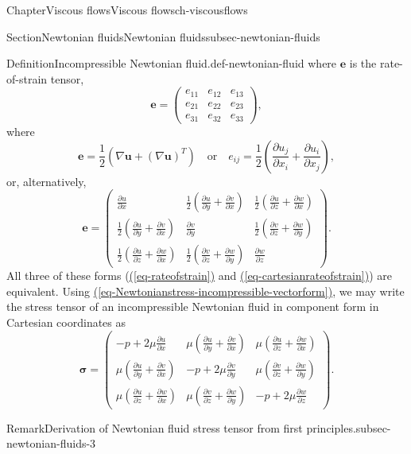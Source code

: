 \documentclass[oneside,10pt,]{book}
\newcommand{\xreffont}{\relax}
\numberwithin{equation}{section}
\newcommand{\pd}[2]{\frac{\partial#1}{\partial#2}}
\newcommand{\be}{\boldsymbol{e}}
\newcommand{\bu}{\boldsymbol{u}}
\newcommand{\bsigma}{\boldsymbol{\sigma}}
\begin{document}
\begin{chapterptx}{Chapter}{Viscous flows}{}{Viscous flows}{}{}{ch-viscousflows}
\begin{sectionptx}{Section}{Newtonian fluids}{}{Newtonian fluids}{}{}{subsec-newtonian-fluids}
\begin{definition}{Definition}{Incompressible Newtonian fluid.}{def-newtonian-fluid}
where \(\be\) is the rate-of-strain tensor,%
\begin{equation*}
\be=\left(\begin{matrix}
e_{11}&e_{12}&e_{13}\\
e_{21}&e_{22}&e_{23}\\
e_{31}&e_{32}&e_{33}
\end{matrix}\right),
\end{equation*}
where%
\begin{equation}
\be=\frac12\left(\nabla\bu+\left(\nabla\bu\right)^T\right)
\quad\textrm{or}\quad
e_{ij}=\frac12\left(\pd{u_j}{x_i}+\pd{u_i}{x_j}\right),\label{eq-rateofstrain}
\end{equation}
or, alternatively,%
\begin{equation}
\be=\left(\begin{array}{ccc}
\pd{u}{x}&\frac12\left(\pd{u}{y}+\pd{v}{x}\right)&\frac12\left(\pd{u}{z}+\pd{w}{x}\right)\\
\frac12\left(\pd{u}{y}+\pd{v}{x}\right)&\pd{v}{y}&\frac12\left(\pd{v}{z}+\pd{w}{y}\right)\\
\frac12\left(\pd{u}{z}+\pd{w}{x}\right)&\frac12\left(\pd{v}{z}+\pd{w}{y}\right)&\pd{w}{z}
\end{array}\right).\label{eq-cartesianrateofstrain}
\end{equation}
All three of these forms (\hyperref[eq-rateofstrain]{({\xreffont\ref{eq-rateofstrain}})} and \hyperref[eq-cartesianrateofstrain]{({\xreffont\ref{eq-cartesianrateofstrain}})}) are equivalent. Using \hyperref[eq-Newtonianstress-incompressible-vectorform]{({\xreffont\ref{eq-Newtonianstress-incompressible-vectorform}})}, we may write the stress tensor of an incompressible Newtonian fluid in component form in Cartesian coordinates as%
\begin{equation}
\bsigma=\left(\begin{matrix}
-p+2\mu\pd{u}{x}&\mu\left(\pd{u}{y}+\pd{v}{x}\right)&\mu\left(\pd{u}{z}+\pd{w}{x}\right)\\
\mu\left(\pd{u}{y}+\pd{v}{x}\right)&-p+2\mu\pd{v}{y}&\mu\left(\pd{v}{z}+\pd{w}{y}\right)\\
\mu\left(\pd{u}{z}+\pd{w}{x}\right)&\mu\left(\pd{v}{z}+\pd{w}{y}\right)&-p+2\mu\pd{w}{z}
\end{matrix}\right).\label{eq-cartesiannewtonianstress}
\end{equation}
%
\end{definition}
\begin{remark}{Remark}{Derivation of Newtonian fluid stress tensor from first principles.}{subsec-newtonian-fluids-3}%

\end{remark}
\end{sectionptx}
\end{chapterptx}
\end{document}
